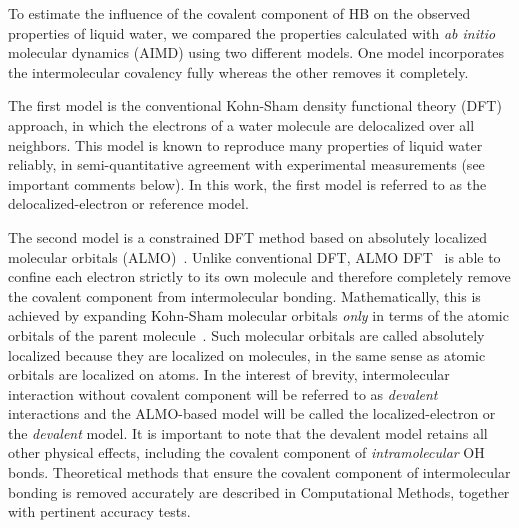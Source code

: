 \documentclass[10pt,amsmath,twocolumn,aps,prl,superscriptaddress,floatfix]{revtex4-1}
\begin{document}

To estimate the influence of the covalent component of HB on the observed properties of liquid water, we compared the properties calculated with \emph{ab initio} molecular dynamics (AIMD) using two different models. 
One model incorporates the intermolecular covalency fully whereas the other removes it completely.

The first model is the conventional Kohn-Sham density functional theory (DFT) approach, in which the electrons of a water molecule are delocalized over all neighbors. 
This model is known to reproduce many properties of liquid water reliably, in semi-quantitative agreement with experimental measurements (see important comments below). 
In this work, the first model is referred to as the delocalized-electron or reference model. 

The second model is a constrained DFT method based on absolutely localized molecular orbitals (ALMO)~\cite{khaliullin2006efficient}. 
Unlike conventional DFT, ALMO DFT~\cite{Khaliullin2013JCTC} is able to confine each electron strictly to its own molecule and therefore completely remove the covalent component from intermolecular bonding. 
Mathematically, this is achieved by expanding Kohn-Sham molecular orbitals \emph{only} in terms of the atomic orbitals of the parent molecule~\cite{stoll1980use,khaliullin2006efficient, mo2000energy}.
Such molecular orbitals are called absolutely localized because they are localized on molecules, in the same sense as atomic orbitals are localized on atoms. 
In the interest of brevity, intermolecular interaction without covalent component will be referred to as \emph{devalent} interactions and the ALMO-based model will be called the localized-electron or the \emph{devalent} model. 
It is important to note that the devalent model retains all other physical effects, including the covalent component of \emph{intramolecular} OH bonds. %
Theoretical methods that ensure the covalent component of intermolecular bonding is removed accurately are described in Computational Methods, together with pertinent accuracy tests.
\end{document}
